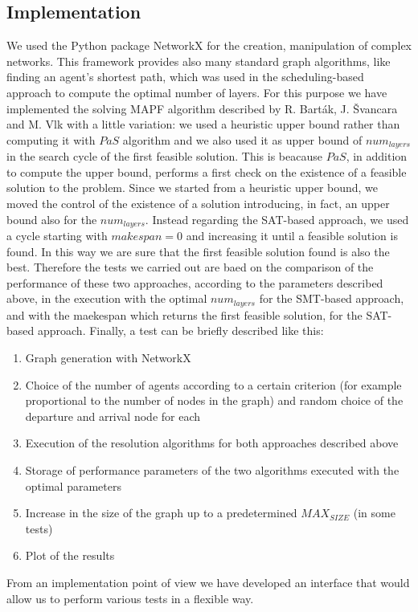 \documentclass[12pt, a4paper, hidelinks]{article}
\numberwithin{equation}{section}
\begin{document}
\subsection{Implementation}\label{subsec:implementation}
We used the Python package NetworkX for the creation, manipulation of complex networks.
This framework provides also many standard graph algorithms, like finding an agent's shortest path,
which was used in the scheduling-based approach to compute the optimal number of layers. For this purpose
we have implemented the solving MAPF algorithm described by R. Barták, J. Švancara and M. Vlk with a little variation:
we used a heuristic upper bound rather than computing it with $PaS$ algorithm and we also
used it as upper bound of $num_{layers}$ in the search cycle of the first feasible solution. This is
beacause $PaS$, in addition to compute the upper bound, performs a first check on the existence of a feasible solution
to the problem. Since we started from a heuristic upper bound, we moved the control of the existence of a solution
introducing, in fact, an upper bound also for the $num_{layers}$. Instead regarding the SAT-based approach,
we used a cycle starting with $makespan = 0$ and increasing it until a feasible solution is found. In this way we are
sure that the first feasible solution found is also the best. Therefore the tests we carried out are baed on the comparison
of the performance of these two approaches, according to the parameters described above, in the execution
with the optimal $num_{layers}$ for the SMT-based approach, and with the maekespan which returns the first
feasible solution, for the SAT-based approach. Finally, a test can be briefly described like this:
\begin{enumerate}
    \item Graph generation with NetworkX
    \item Choice of the number of agents according to a certain criterion (for example proportional to the number of nodes in the graph) and random choice of the departure and arrival node for each
    \item Execution of the resolution algorithms for both approaches described above
    \item Storage of performance parameters of the two algorithms executed with the optimal parameters
    \item Increase in the size of the graph up to a predetermined $MAX_{SIZE}$ (in some tests)
    \item Plot of the results
\end{enumerate}
From an implementation point of view we have developed an interface that would allow us to perform various tests in a flexible way.
\end{document}
